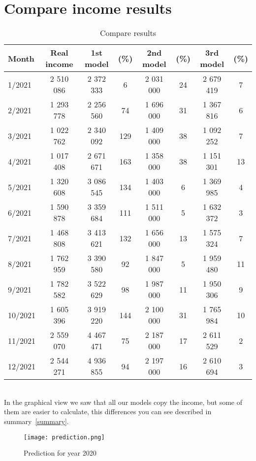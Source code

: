 \section{Compare income results} \label{compareresults}
\begin{table}[h!]
    \begin{center}
        \begin{tabular}{ | l | c | c | c | c | c | c | c |}
            \hline
            {\textbf{Month}} & \textbf{Real income} & \textbf{1st model} & \textbf{(\%)}  & \textbf{2nd model} & \textbf{(\%)} & \textbf{3rd model} & \textbf{(\%)}\\
            \hline
            1/2021 & 2 510 086 & 2 372 333 & 6 & 2 031 000 & 24 & 2 679 419 & 7\\
            2/2021 & 1 293 778 & 2 256 560 & 74 & 1 696 000 & 31 & 1 367 816 & 6\\
            3/2021 & 1 022 762 & 2 340 092 & 129 & 1 409 000 & 38 & 1 092 252 & 7\\
            4/2021 & 1 017 408 & 2 671 671 & 163 & 1 358 000 & 38 & 1 151 301 & 13\\
            5/2021 & 1 320 608 & 3 086 545 & 134 & 1 403 000 & 6 & 1 369 985 & 4\\
            6/2021 & 1 590 878 & 3 359 684 & 111 & 1 511 000 & 5 & 1 632 372 & 3\\
            7/2021 & 1 468 808 & 3 413 621 & 132 & 1 656 000 & 13 & 1 575 324 & 7\\
            8/2021 & 1 762 959 & 3 390 580 & 92 & 1 847 000 & 5 & 1 959 480 & 11\\
            9/2021 & 1 782 582 & 3 522 629 & 98 & 1 987 000 & 11 & 1 950 306 & 9\\
            10/2021 & 1 605 396 & 3 919 220 & 144 & 2 100 000 & 31 & 1 765 984 & 10\\
            11/2021 & 2 559 070 & 4 467 471 & 75 & 2 187 000 & 17 & 2 611 529 & 2\\
            12/2021 & 2 544 271 & 4 936 855 & 94 & 2 197 000 & 16 & 2 610 694 & 3\\
            \hline
        \end{tabular}
    \end{center}
    \caption{Compare results}
    \label{Compare results}
\end{table}\\
In the graphical view we saw that all our models copy the income, but some of them are easier to calculate, this differences you can see described in summary~\ref{summary}.
\begin{figure}[h!]
    \begin{center}
        \texttt{[image: prediction.png]}
    \end{center}
    \caption{Prediction for year 2020}
    \label{prediction}
\end{figure}\\
\newpage
